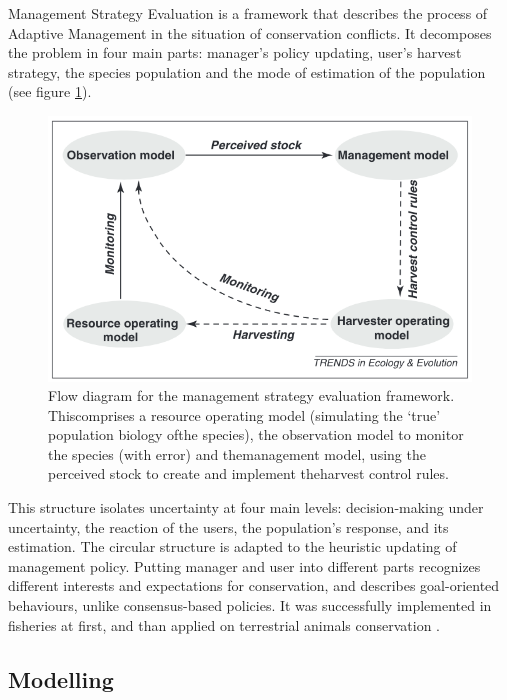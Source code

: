 \documentclass[12pt,a4paper]{article}
\begin{document}
Management Strategy Evaluation is a framework that describes the process of Adaptive Management in the situation of conservation conflicts.
It decomposes the problem in four main parts: manager's policy updating, user's harvest strategy, the species population and the mode of estimation of the population (see figure \ref{msediagram}).
\begin{figure}
	\centering
	\includegraphics[scale=0.5]{msediagram.png}
	\caption{Flow diagram for the management strategy evaluation framework. Thiscomprises a resource operating model (simulating the ‘true’ population biology ofthe species), the observation model to monitor the species (with error) and themanagement model, using the perceived stock to create and implement theharvest control rules. \citep{BUNNEFELD2011441}}
	\label{msediagram}
\end{figure}
This structure isolates uncertainty at four main levels: decision-making under uncertainty, the reaction of the users, the population's response,
and its estimation.
The circular structure is adapted to the heuristic updating of management policy.
Putting manager and user into different parts recognizes different interests and expectations for conservation, and describes goal-oriented behaviours, unlike consensus-based policies.
It was successfully implemented in fisheries at first, and than applied on terrestrial animals conservation \citep{BUNNEFELD2011441, bunnefeld2013incentivizing}.

\subsection{Modelling}
\end{document}
